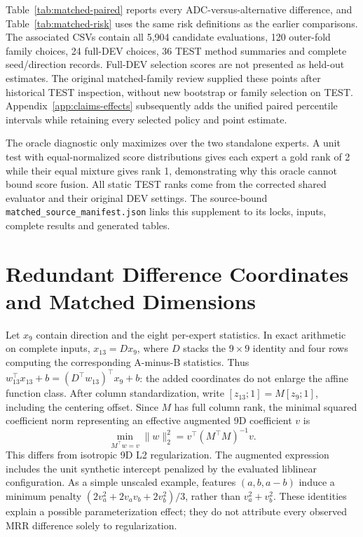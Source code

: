 \documentclass[11pt,a4paper]{article}
\begin{document}
Table~\ref{tab:matched-paired} reports every ADC-versus-alternative difference, and Table~\ref{tab:matched-risk} uses the same risk definitions as the earlier comparisons. The associated CSVs contain all 5,904 candidate evaluations, 120 outer-fold family choices, 24 full-DEV choices, 36 TEST method summaries and complete seed/direction records. Full-DEV selection scores are not presented as held-out estimates. The original matched-family review supplied these points after historical TEST inspection, without new bootstrap or family selection on TEST. Appendix~\ref{app:claims-effects} subsequently adds the unified paired percentile intervals while retaining every selected policy and point estimate.


\FloatBarrier
\clearpage


The oracle diagnostic only maximizes over the two standalone experts. A unit test with equal-normalized score distributions gives each expert a gold rank of 2 while their equal mixture gives rank 1, demonstrating why this oracle cannot bound score fusion. All static TEST ranks come from the corrected shared evaluator and their original DEV settings. The source-bound \texttt{matched\_source\_manifest.json} links this supplement to its locks, inputs, complete results and generated tables.
\FloatBarrier

\section{Redundant Difference Coordinates and Matched Dimensions}
\label{app:feature-dimension}
Let $x_9$ contain direction and the eight per-expert statistics. In exact arithmetic on complete inputs, $x_{13}=Dx_9$, where $D$ stacks the $9\times9$ identity and four rows computing the corresponding A-minus-B statistics. Thus $w_{13}^{\top}x_{13}+b=(D^{\top}w_{13})^{\top}x_9+b$: the added coordinates do not enlarge the affine function class. After column standardization, write $[z_{13};1]=M[z_9;1]$, including the centering offset. Since $M$ has full column rank, the minimal squared coefficient norm representing an effective augmented 9D coefficient $v$ is
\begin{equation}
\min_{M^{\top}w=v}\|w\|_2^2=v^{\top}(M^{\top}M)^{-1}v.
\label{eq:redundant-penalty}
\end{equation}
This differs from isotropic 9D L2 regularization. The augmented expression includes the unit synthetic intercept penalized by the evaluated liblinear configuration. As a simple unscaled example, features $(a,b,a-b)$ induce a minimum penalty $(2v_a^2+2v_av_b+2v_b^2)/3$, rather than $v_a^2+v_b^2$. These identities explain a possible parameterization effect; they do not attribute every observed MRR difference solely to regularization.
\end{document}
